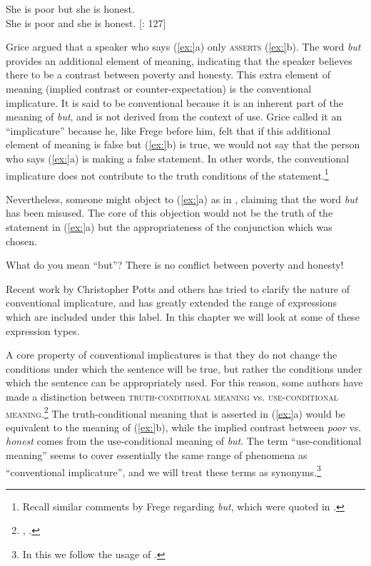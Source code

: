 \ea
\ea She is poor but she is honest.\\
\ex She is poor and she is honest.  [\citealt{Grice1961}: 127]
                       \z
\z


Grice argued that a speaker who says (\ref{ex:}a) only \textsc{asserts} (\ref{ex:}b). The word \textit{but} provides an additional element of meaning, indicating that the speaker believes there to be a contrast between poverty and honesty. This extra element of meaning (implied contrast or counter-expectation) is the conventional implicature. It is said to be conventional because it is an inherent part of the meaning of \textit{but}, and is not derived from the context of use. Grice called it an “implicature” because he, like Frege before him, felt that if this additional element of meaning is false but (\ref{ex:}b) is true, we would not say that the person who says (\ref{ex:}a) is making a false statement. In other words, the conventional implicature does not contribute to the truth conditions of the statement.\footnote{Recall similar comments by Frege regarding \textit{but}, which were quoted in .}



Nevertheless, someone might object to (\ref{ex:}a) as in , claiming that the word \textit{but} has been misused. The core of this objection would not be the truth of the statement in (\ref{ex:}a) but the appropriateness of the conjunction which was chosen.


\ea
What do you mean “but”? There is no conflict between poverty and honesty!
\z


Recent work by Christopher Potts and others has tried to clarify the nature of conventional implicature, and has greatly extended the range of expressions which are included under this label. In this chapter we will look at some of these expression types.



A core property of conventional implicatures is that they do not change the conditions under which the sentence will be true, but rather the conditions under which the sentence can be appropriately used. For this reason, some authors have made a distinction between \textsc{truth-conditional meaning} vs. \textsc{use-conditional meaning}.\footnote{\citet{Gutzmann2015}, \citet{Recanati2004}.} The truth-conditional meaning that is asserted in (\ref{ex:}a) would be equivalent to the meaning of (\ref{ex:}b), while the implied contrast between \textit{poor} vs. \textit{honest} comes from the use-conditional meaning of \textit{but}. The term “use-conditional meaning” seems to cover essentially the same range of phenomena as “conventional implicature”, and we will treat these terms as synonyms.\footnote{In this we follow the usage of \citet{Gutzmann2015}.}



